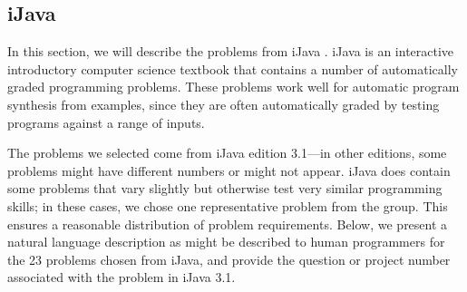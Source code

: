 \documentclass{sig-alternate}
\begin{document}
\subsection{iJava}

In this section, we will describe the problems from iJava \cite{iJava, Moll:2011:IOI:1968521.1968535}. iJava is an interactive introductory computer science textbook that contains a number of automatically graded programming problems. These problems work well for automatic program synthesis from examples, since they are often automatically graded by testing programs against a range of inputs.

The problems we selected come from iJava edition 3.1---in other editions, some problems might have different numbers or might not appear. iJava does contain some problems that vary slightly but otherwise test very similar programming skills; in these cases, we chose one representative problem from the group. This ensures a reasonable distribution of problem requirements. Below, we present a natural language description as might be described to human programmers for the 23 problems chosen from iJava, and provide the question or project number associated with the problem in iJava 3.1.
\end{document}
